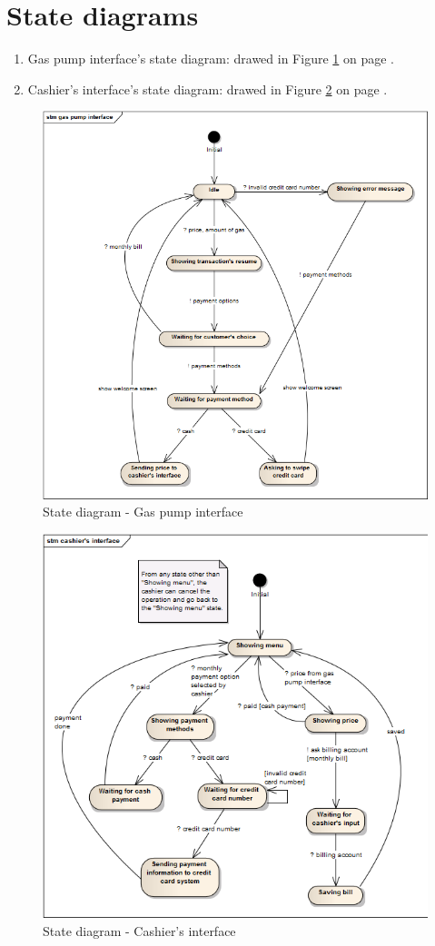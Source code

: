 \documentclass[11pt,a4paper]{article}
\begin{document}
\section{State diagrams}


\begin{enumerate}
	\item Gas pump interface's state diagram: drawed in Figure \ref{fig:state1} on page \pageref{fig:state1}.
	\item Cashier's interface's state diagram: drawed in Figure \ref{fig:state2} on page \pageref{fig:state2}.
\end{enumerate}

\begin{figure}[H]
 \centering
 \includegraphics[width=\textwidth]{../state-diagram-gas-pump-interface.png} 
 \caption{State diagram - Gas pump interface}
 \label{fig:state1}
\end{figure}

\begin{figure}[H]
 \centering
 \includegraphics[width=\textwidth]{../state-diagram-cashier-interface.png} 
 \caption{State diagram - Cashier's interface}
 \label{fig:state2}
\end{figure}
\end{document}
